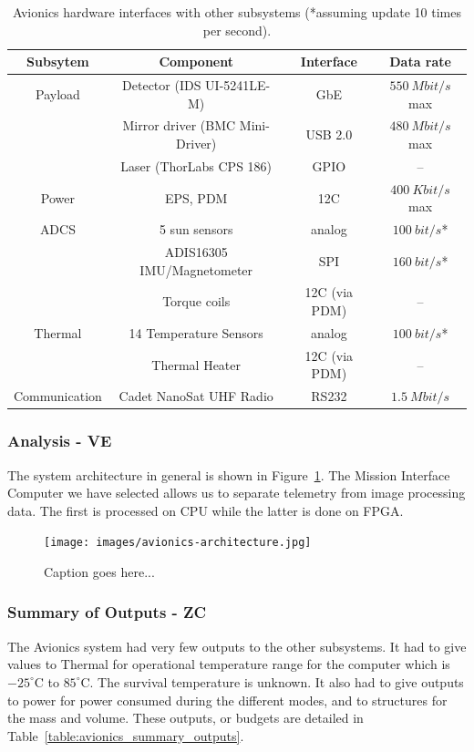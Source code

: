 \documentclass[12pt]{article}
\begin{document}
\begin{table}[ht]
\caption{Avionics hardware interfaces with other subsystems (*assuming update 10 times per second).}
\label{table:avionics_interfaces}
\begin{center}
    \begin{tabular}{| c | c | c | c |} \hline
    	Subsytem & Component & Interface & Data rate \\ \hline \hline
    Payload & Detector (IDS UI-5241LE-M) & GbE & $550\ Mbit/s$ max  \\
     & Mirror driver (BMC Mini-Driver) & USB 2.0 & $480\ Mbit/s$ max \\
     & Laser (ThorLabs CPS 186) & GPIO & -- \\ \hline
    Power & EPS, PDM & 12C & $400\ Kbit/s$ max \\ \hline
    ADCS & 5 sun sensors & analog & $100\ bit/s$* \\
     & ADIS16305 IMU/Magnetometer & SPI & $160\ bit/s$* \\
     & Torque coils & 12C (via PDM) & -- \\ \hline
    Thermal & 14 Temperature Sensors & analog & $100\ bit/s$* \\
     & Thermal Heater & 12C (via PDM) & -- \\ \hline
    Communication & Cadet NanoSat UHF Radio & RS232 & $1.5\ Mbit/s$ \\ \hline 
    \end{tabular}
\end{center}
\end{table}

			\subsubsection{Analysis - VE}
The system architecture in general is shown in Figure~\ref{fig:avionics_architecture}. The Mission Interface Computer we have selected allows us to separate telemetry from image processing data. The first is processed on CPU while the latter is done on FPGA.

\begin{figure}[ht]
\centering
  \texttt{[image: images/avionics-architecture.jpg]}
\caption{Caption goes here...}
\label{fig:avionics_architecture}
\end{figure}

			\subsubsection{Summary of Outputs - ZC}
The Avionics system had very few outputs to the other subsystems. It had to give values to Thermal for operational temperature range for the computer which is $-25^\circ$C to $85^\circ$C. The survival temperature is unknown. It also had to give outputs to power for power consumed during the different modes, and to structures for the mass and volume. These outputs, or budgets are detailed in Table~\ref{table:avionics_summary_outputs}.
\end{document}
